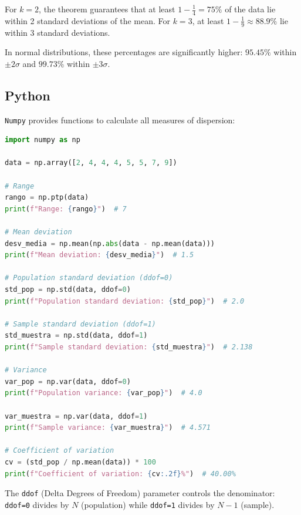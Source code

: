 \begin{remark}
	For $k=2$, the theorem guarantees that at least $1 - \frac{1}{4} = 75\%$ of the data lie within 2 standard deviations of the mean. For $k=3$, at least $1 - \frac{1}{9} \approx 88.9\%$ lie within 3 standard deviations.
	
	In normal distributions, these percentages are significantly higher: $95.45\%$ within $\pm 2\sigma$ and $99.73\%$ within $\pm 3\sigma$.
\end{remark}


\subsection{Python}

\texttt{Numpy} provides functions to calculate all measures of dispersion:

\begin{lstlisting}[language=Python]
import numpy as np

data = np.array([2, 4, 4, 4, 5, 5, 7, 9])

# Range
rango = np.ptp(data)
print(f"Range: {rango}")  # 7

# Mean deviation
desv_media = np.mean(np.abs(data - np.mean(data)))
print(f"Mean deviation: {desv_media}")  # 1.5

# Population standard deviation (ddof=0)
std_pop = np.std(data, ddof=0)
print(f"Population standard deviation: {std_pop}")  # 2.0

# Sample standard deviation (ddof=1)
std_muestra = np.std(data, ddof=1)
print(f"Sample standard deviation: {std_muestra}")  # 2.138

# Variance
var_pop = np.var(data, ddof=0)
print(f"Population variance: {var_pop}")  # 4.0

var_muestra = np.var(data, ddof=1)
print(f"Sample variance: {var_muestra}")  # 4.571

# Coefficient of variation
cv = (std_pop / np.mean(data)) * 100
print(f"Coefficient of variation: {cv:.2f}%")  # 40.00%
\end{lstlisting}

\begin{remark}
	The \texttt{ddof} (Delta Degrees of Freedom) parameter controls the denominator: \texttt{ddof=0} divides by $N$ (population) while \texttt{ddof=1} divides by $N-1$ (sample).
\end{remark}

